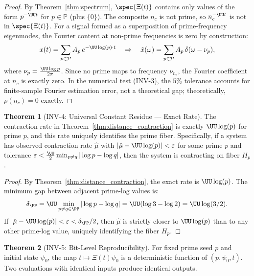\documentclass[12pt,letterpaper]{article}
\theoremstyle{definition}
\newtheorem{theorem}{Theorem}[section]
\theoremstyle{remark}
\begin{document}
\begin{proof}
By Theorem~\ref{thm:spectrum}, $\spec{\Xi(t)}$ contains only values
of the form $p^{-\UU t}$ for $p \in \mathbb{P}$ (plus $\{0\}$).
The composite $n_c$ is not prime, so $n_c^{-\UU t}$ is not in $\spec{\Xi(t)}$.
For a signal formed as a superposition of prime-frequency eigenmodes,
the Fourier content at non-prime frequencies is zero by construction:
\[
  x(t) = \sum_{p \in \mathcal{P}} A_p\,e^{-\UU\log(p)\cdot t}
  \quad \Rightarrow \quad
  \hat{x}(\omega) = \sum_{p \in \mathcal{P}} A_p\,\delta(\omega - \nu_p),
\]
where $\nu_p = \frac{\UU\log p}{2\pi}$. Since no prime maps to frequency $\nu_{n_c}$,
the Fourier coefficient at $n_c$ is exactly zero.
In the numerical test (INV-3), the $5\%$ tolerance accounts for
finite-sample Fourier estimation error, not a theoretical gap; theoretically,
$\rho(n_c) = 0$ exactly.
\end{proof}

\begin{theorem}[INV-4: Universal Constant Residue --- Exact Rate]
\label{thm:inv4}
The contraction rate in Theorem~\ref{thm:distance_contraction}
is exactly $\UU\log(p)$ for prime $p$, and this rate uniquely
identifies the prime fiber. Specifically, if a system has
observed contraction rate $\hat\mu$ with $|\hat\mu - \UU\log(p)| < \varepsilon$
for some prime $p$ and tolerance $\varepsilon < \frac{\UU}{2}\min_{p\neq q}|\log p - \log q|$,
then the system is contracting on fiber $H_p$.
\end{theorem}

\begin{proof}
By Theorem~\ref{thm:distance_contraction}, the exact rate is $\UU\log(p)$.
The minimum gap between adjacent prime-log values is:
\[
  \delta_\PP = \UU \min_{p \neq q \in \PP}|\log p - \log q|
             = \UU(\log 3 - \log 2)
             = \UU\log(3/2).
\]
If $|\hat\mu - \UU\log(p)| < \varepsilon < \delta_\PP/2$, then
$\hat\mu$ is strictly closer to $\UU\log(p)$ than to any other
prime-log value, uniquely identifying the fiber $H_p$.
\end{proof}

\begin{theorem}[INV-5: Bit-Level Reproducibility]
\label{thm:inv5}
For fixed prime seed $p$ and initial state $\psi_0$, the map
$t \mapsto \Xi(t)\psi_0$ is a deterministic function of $(p, \psi_0, t)$.
Two evaluations with identical inputs produce identical outputs.
\end{theorem}
\end{document}
